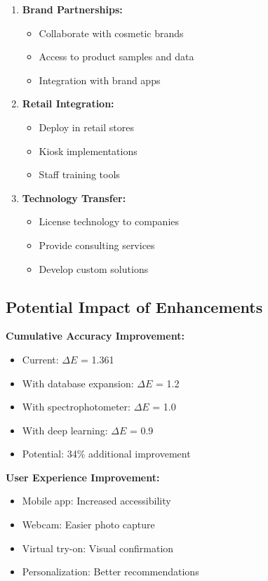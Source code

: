\begin{enumerate}
    \item \textbf{Brand Partnerships:}
    \begin{itemize}
        \item Collaborate with cosmetic brands
        \item Access to product samples and data
        \item Integration with brand apps
    \end{itemize}
    
    \item \textbf{Retail Integration:}
    \begin{itemize}
        \item Deploy in retail stores
        \item Kiosk implementations
        \item Staff training tools
    \end{itemize}
    
    \item \textbf{Technology Transfer:}
    \begin{itemize}
        \item License technology to companies
        \item Provide consulting services
        \item Develop custom solutions
    \end{itemize}
\end{enumerate}

\subsection{Potential Impact of Enhancements}

\textbf{Cumulative Accuracy Improvement:}
\begin{itemize}
    \item Current: $\Delta E$ = 1.361
    \item With database expansion: $\Delta E$ = 1.2
    \item With spectrophotometer: $\Delta E$ = 1.0
    \item With deep learning: $\Delta E$ = 0.9
    \item Potential: 34\% additional improvement
\end{itemize}

\textbf{User Experience Improvement:}
\begin{itemize}
    \item Mobile app: Increased accessibility
    \item Webcam: Easier photo capture
    \item Virtual try-on: Visual confirmation
    \item Personalization: Better recommendations
\end{itemize}

